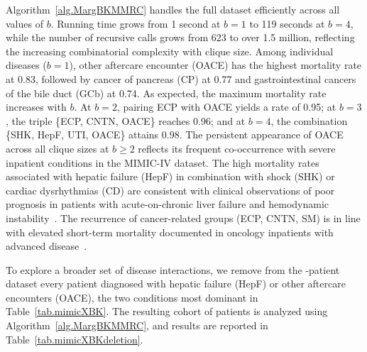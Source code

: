 Algorithm~\ref{alg.MargBKMMRC} handles the full dataset efficiently across
all values of $b$. Running time grows from 1 second at $b=1$ to 119
seconds at $b=4$, while the number of recursive calls grows from 623
to over 1.5 million, reflecting the increasing combinatorial
complexity with clique size. Among individual diseases ($b=1$), other
aftercare encounter (OACE) has the highest mortality rate at 0.83,
followed by cancer of pancreas (CP) at 0.77 and gastrointestinal
cancers of the bile duct (GCb) at 0.74. As expected, the maximum
mortality rate increases with $b$. At $b=2$, pairing ECP with OACE
yields a rate of 0.95; at $b=3$, the triple \{ECP, CNTN, OACE\}
reaches 0.96; and at $b=4$, the combination \{SHK, HepF, UTI, OACE\}
attains 0.98. The persistent appearance of OACE across all clique
sizes at $b \ge 2$ reflects its frequent co-occurrence with severe
inpatient conditions in the MIMIC-IV dataset. The high mortality rates
associated with hepatic failure (HepF) in combination with shock (SHK)
or cardiac dysrhythmias (CD) are consistent with clinical observations
of poor prognosis in patients with acute-on-chronic liver failure and
hemodynamic instability~\citep{Hernaez2017,Moreau2013}. The recurrence
of cancer-related groups (ECP, CNTN, SM) is in line with elevated
short-term mortality documented in oncology inpatients with advanced
disease~\citep{Earle2008,Numico2015}.

To explore a broader set of disease interactions, we remove from the
-patient dataset every patient diagnosed with hepatic
failure (HepF) or other aftercare encounters (OACE), the two conditions
most dominant in Table~\ref{tab.mimicXBK}. The resulting cohort of
 patients is analyzed using Algorithm~\ref{alg.MargBKMMRC},
and results are reported in Table~\ref{tab.mimicXBKdeletion}.

